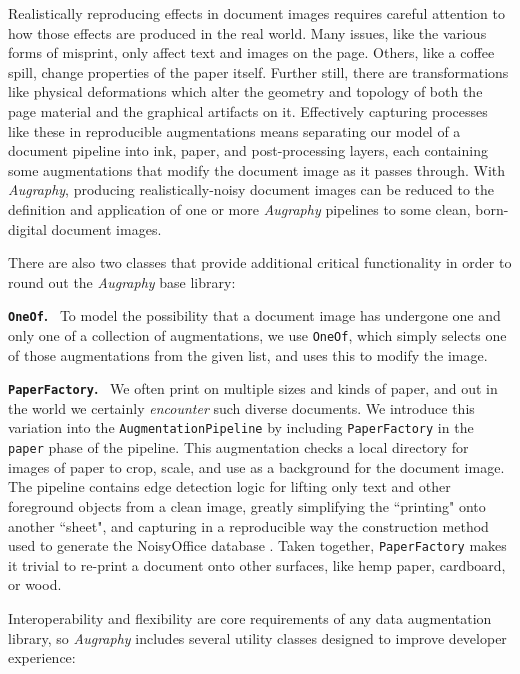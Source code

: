 \documentclass[runningheads]{llncs}
\begin{document}
Realistically reproducing effects in document images requires careful attention to how those effects are produced in the real world.
Many issues, like the various forms of misprint, only affect text and images on the page.
Others, like a coffee spill, change properties of the paper itself. Further still, there are transformations like physical deformations which alter the geometry and topology of both the page material and the graphical artifacts on it.
Effectively capturing processes like these in reproducible augmentations means separating our model of a document pipeline into ink, paper, and post-processing layers, each containing some augmentations that modify the document image as it passes through.
With \emph{Augraphy}, producing realistically-noisy document images can be reduced to the definition and application of one or more \emph{Augraphy} pipelines to some clean, born-digital document images.

\sectionfont{\keepall}
There are also two classes that provide additional critical functionality in order to round out the \emph{Augraphy} base library:

\noindent\textbf{\texttt{OneOf}.} ~To model the possibility that a document image has undergone one and only one of a collection of augmentations, we use \texttt{OneOf}, which simply selects one of those augmentations from the given list, and uses this to modify the image.

\sectionfont{\normalfont}
\noindent\textbf{\texttt{PaperFactory}.} ~We often print on multiple sizes and kinds of paper, and out in the world we certainly \textit{encounter} such diverse documents.
We introduce this variation into the \texttt{AugmentationPipeline} by including \texttt{PaperFactory} in the \texttt{paper} phase of the pipeline.
This augmentation checks a local directory for images of paper to crop, scale, and use as a background for the document image.
The pipeline contains edge detection logic for lifting only text and other foreground objects from a clean image, greatly simplifying the ``printing" onto another ``sheet", and capturing in a reproducible way the construction method used to generate the NoisyOffice database \cite{ref_NoisyOfficeDatabase}.
Taken together, \texttt{PaperFactory} makes it trivial to re-print a document onto other surfaces, like hemp paper, cardboard, or wood.

\smallskip
Interoperability and flexibility are core requirements of any data augmentation library, so \emph{Augraphy} includes several utility classes designed to improve developer experience:
\end{document}

